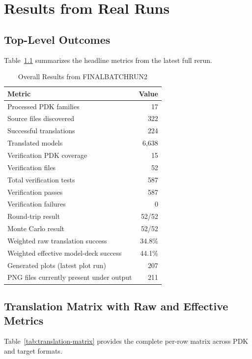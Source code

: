 \documentclass[12pt,a4paper,oneside]{report}
\begin{document}
\chapter{Results from Real Runs}

\section{Top-Level Outcomes}
Table~\ref{tab:overall} summarizes the headline metrics from the latest full rerun.

\begin{table}[H]
\centering
\caption{Overall Results from FINALBATCHRUN2}
\label{tab:overall}
\begin{tabular}{p{8.3cm}r}
\toprule
Metric & Value \\
\midrule
Processed PDK families & 17 \\
Source files discovered & 322 \\
Successful translations & 224 \\
Translated models & 6,638 \\
Verification PDK coverage & 15 \\
Verification files & 52 \\
Total verification tests & 587 \\
Verification passes & 587 \\
Verification failures & 0 \\
Round-trip result & 52/52 \\
Monte Carlo result & 52/52 \\
Weighted raw translation success & 34.8\% \\
Weighted effective model-deck success & 44.1\% \\
Generated plots (latest plot run) & 207 \\
PNG files currently present under output & 211 \\
\bottomrule
\end{tabular}
\end{table}

\section{Translation Matrix with Raw and Effective Metrics}
Table~\ref{tab:translation-matrix} provides the complete per-row matrix across PDK and target formats.
\end{document}
